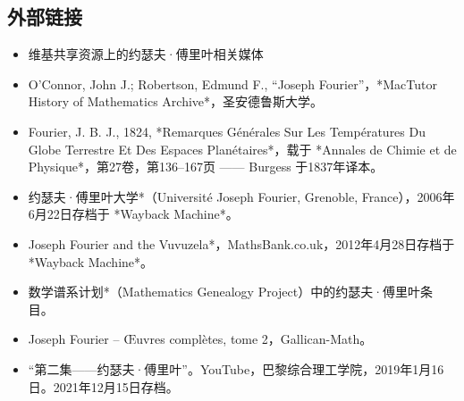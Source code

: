\subsection{外部链接}
\begin{itemize}
\item 维基共享资源上的约瑟夫·傅里叶相关媒体

\item O'Connor, John J.; Robertson, Edmund F., “Joseph Fourier”，*MacTutor History of Mathematics Archive*，圣安德鲁斯大学。
\item Fourier, J. B. J., 1824, *Remarques Générales Sur Les Températures Du Globe Terrestre Et Des Espaces Planétaires*，载于 *Annales de Chimie et de Physique*，第27卷，第136–167页 —— Burgess 于1837年译本。
\item 约瑟夫·傅里叶大学*（Université Joseph Fourier, Grenoble, France），2006年6月22日存档于 *Wayback Machine*。
\item Joseph Fourier and the Vuvuzela*，MathsBank.co.uk，2012年4月28日存档于 *Wayback Machine*。
\item 数学谱系计划*（Mathematics Genealogy Project）中的约瑟夫·傅里叶条目。
\item Joseph Fourier – Œuvres complètes, tome 2，Gallican-Math。
\item “第二集——约瑟夫·傅里叶”。YouTube，巴黎综合理工学院，2019年1月16日。2021年12月15日存档。
\end{itemize}